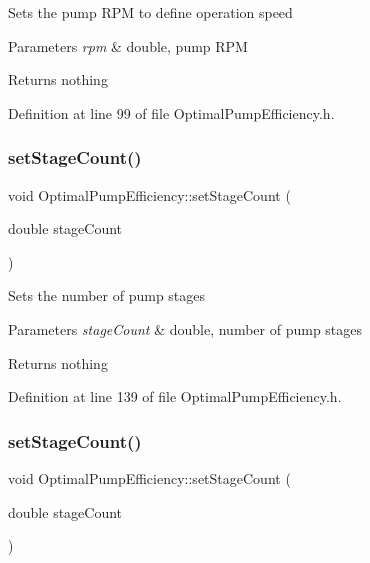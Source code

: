 Sets the pump R\+PM to define operation speed


\begin{DoxyParams}{Parameters}
{\em rpm} & double, pump R\+PM\\
\hline
\end{DoxyParams}
\begin{DoxyReturn}{Returns}
nothing 
\end{DoxyReturn}


Definition at line 99 of file Optimal\+Pump\+Efficiency.\+h.

\mbox{\label{class_optimal_pump_efficiency_a5b0b2a24a87c1c8fc92aa96c6ba4b727}} 
\subsubsection{\texorpdfstring{set\+Stage\+Count()}{setStageCount()}\hspace{0.1cm}{\footnotesize\ttfamily [1/3]}}
{\footnotesize\ttfamily void Optimal\+Pump\+Efficiency\+::set\+Stage\+Count (\begin{DoxyParamCaption}\item[{double}]{stage\+Count }\end{DoxyParamCaption})\hspace{0.3cm}{\ttfamily [inline]}}

Sets the number of pump stages


\begin{DoxyParams}{Parameters}
{\em stage\+Count} & double, number of pump stages\\
\hline
\end{DoxyParams}
\begin{DoxyReturn}{Returns}
nothing 
\end{DoxyReturn}


Definition at line 139 of file Optimal\+Pump\+Efficiency.\+h.

\mbox{\label{class_optimal_pump_efficiency_a5b0b2a24a87c1c8fc92aa96c6ba4b727}} 
\subsubsection{\texorpdfstring{set\+Stage\+Count()}{setStageCount()}\hspace{0.1cm}{\footnotesize\ttfamily [2/3]}}
{\footnotesize\ttfamily void Optimal\+Pump\+Efficiency\+::set\+Stage\+Count (\begin{DoxyParamCaption}\item[{double}]{stage\+Count }\end{DoxyParamCaption})\hspace{0.3cm}{\ttfamily [inline]}}

